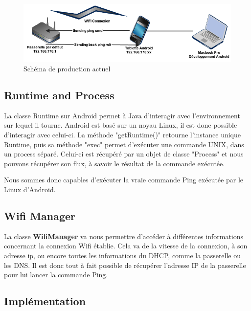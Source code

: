 \begin{figure}[H]
    \begin{center}
        \centering \includegraphics[width=\textwidth]{00_media/schema_ping}
        \caption{Schéma de production actuel}
    \end{center}
\end{figure}

\subsection{Runtime and Process}
La classe Runtime sur Android permet à Java d'interagir avec l'environnement sur lequel il tourne. Android est basé sur un noyau Linux, il est donc possible d'interagir avec celui-ci.
La méthode "getRuntime()" retourne l'instance unique Runtime, puis sa méthode "exec" permet d'exécuter une commande UNIX, dans un process séparé. Celui-ci est récupéré par un objet de classe "Process" et nous pouvons récupérer son flux, à savoir le résultat de la commande exécutée.

Nous sommes donc capables d'exécuter la vraie commande Ping exécutée par le Linux d'Android.

\subsection{Wifi Manager}
La classe \textbf{WifiManager} va nous permettre d'accéder à différentes informations concernant la connexion Wifi établie. Cela va de la vitesse de la connexion, à son adresse ip, ou encore toutes les informations du DHCP, comme la passerelle ou les DNS. Il est donc tout à fait possible de récupérer l'adresse IP de la passerelle pour lui lancer la commande Ping.

\subsection{Implémentation}
